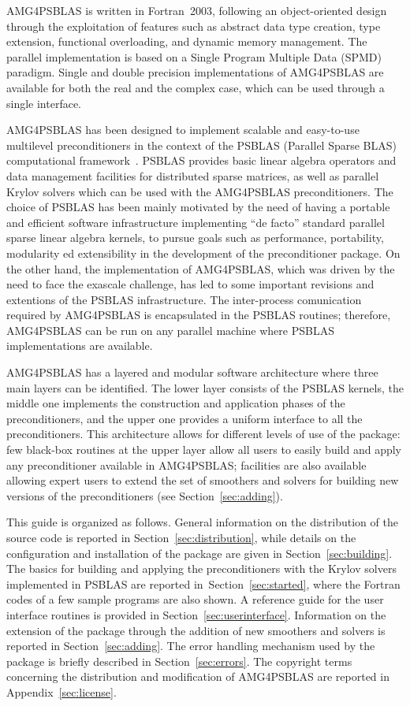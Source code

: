 AMG4PSBLAS is written in Fortran~2003, following an
object-oriented design through the exploitation of features
such as abstract data type creation, type extension, functional overloading, and
dynamic memory management.
The parallel implementation is based on a Single Program Multiple Data
(SPMD) paradigm.  Single and
double precision implementations of AMG4PSBLAS are available for both the
real and the complex case, which can be used through a single
interface.

AMG4PSBLAS has been designed to implement scalable and easy-to-use
multilevel preconditioners in the context of the PSBLAS (Parallel Sparse BLAS)
computational framework~\cite{psblas_00,PSBLAS3}. PSBLAS provides basic linear algebra
operators and data management facilities for distributed sparse matrices,
as well as parallel Krylov solvers which can be used with the AMG4PSBLAS preconditioners.
The choice of PSBLAS has been mainly motivated by the need of having
a portable and efficient software infrastructure implementing ``de facto'' standard
parallel sparse linear algebra kernels, to pursue goals such as performance,
portability, modularity ed extensibility in the development of the preconditioner
package. On the other hand, the implementation of AMG4PSBLAS, which was driven by the need to face the exascale challenge, has led to some important  revisions and extentions of the PSBLAS infrastructure.
The inter-process comunication required by AMG4PSBLAS is encapsulated
in the PSBLAS routines;
therefore, AMG4PSBLAS can be run on any parallel machine where PSBLAS
implementations are available.

AMG4PSBLAS has a layered and modular software architecture where three main layers can be
identified.  The lower layer consists of the PSBLAS kernels, the middle one implements
the construction and application phases of the preconditioners, and the upper one
provides a uniform interface to all the preconditioners.
This architecture allows for different levels of use of the package:
few black-box routines at the upper layer allow all users to easily
build and apply any preconditioner available in AMG4PSBLAS;
facilities are also available allowing expert users to extend the set of smoothers
and solvers for building new versions of the preconditioners (see
Section~\ref{sec:adding}).

This guide is organized as follows. General information on the distribution of the source
code is reported in Section~\ref{sec:distribution}, while details on the configuration
and installation of the package are given in Section~\ref{sec:building}. The basics for building and applying the
preconditioners with the Krylov solvers implemented in PSBLAS are reported
in~Section~\ref{sec:started}, where the Fortran codes of a few sample programs
are also shown. A reference guide for the user interface routines is provided
in Section~\ref{sec:userinterface}. Information on the extension of the package
through the addition of new smoothers and solvers is reported in Section~\ref{sec:adding}.
The error handling mechanism used by the package
is briefly described in Section~\ref{sec:errors}. The copyright terms concerning the
distribution and modification of AMG4PSBLAS are reported in Appendix~\ref{sec:license}.

